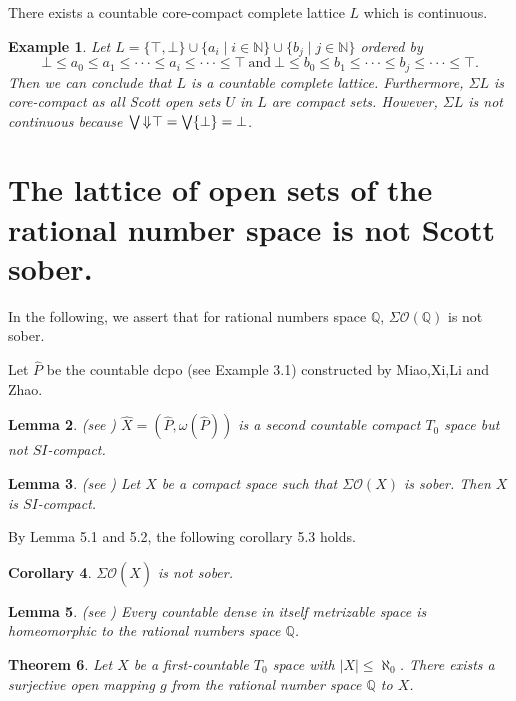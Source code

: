 \documentclass[preprint,12pt]{elsarticle}
\numberwithin{equation}{section}
\newtheorem{theorem}{Theorem}[section]
\newtheorem{lemma}[theorem]{Lemma}
\newtheorem{corollary}[theorem]{Corollary}
\newtheorem{example}[theorem]{Example}
\newcommand{\uuar}{\mathord{\Downarrow}\hspace{0.05em}}
\begin{document}
There exists a countable core-compact complete lattice $L$ which is continuous.
\begin{example} {\rm Let $L=\{\top,\bot\}\cup\{a_{i}\mid i\in\mathbb{N}\}\cup\{b_{j}\mid j\in\mathbb{N}\}$ ordered by $$\bot\leq a_{0}\leq a_{1}\leq\cdot\cdot\cdot\leq a_{i}\leq\cdot\cdot\cdot\leq\top\ \text{and}\ \bot\leq b_{0}\leq b_{1}\leq\cdot\cdot\cdot\leq b_{j}\leq\cdot\cdot\cdot\leq\top.$$ Then we can conclude that $L$ is a countable complete lattice. Furthermore, $\Sigma L$ is core-compact as all Scott open sets $U$ in $L$ are compact sets. However, $\Sigma L$ is not continuous because $\bigvee\uuar \top=\bigvee\{\bot\}=\bot$. }

\end{example}


\section{The lattice of open sets of the rational number space is not Scott sober.}
In the following, we assert that for rational numbers space $\mathbb{Q}$, $\Sigma\mathcal{O}(\mathbb{Q})$ is not sober.

Let $\widehat{P}$ be the countable dcpo (see \cite{AB75} Example 3.1) constructed by Miao,Xi,Li and Zhao.
\begin{lemma}{\rm (see \cite{U18}) $\widehat{X}=(\widehat{P},\omega(\widehat{P}))$ is a second countable compact $T_{0}$ space but not $SI$-compact.}
\end{lemma}



\begin{lemma}{\rm (see \cite{U19}) Let $X$ be a compact space such that $\Sigma\mathcal{O}(X)$ is sober. Then $X$ is $SI$-compact.}
\end{lemma}

By Lemma 5.1 and 5.2, the following corollary 5.3 holds.

\begin{corollary}{\rm $\Sigma\mathcal{O}(\widehat{X})$ is not sober.}

\end{corollary}

\begin{lemma}{\rm (see \cite{RE77}) Every countable dense in itself metrizable space is homeomorphic to the rational numbers space $\mathbb{Q}$.}
\end{lemma}

\begin{theorem} {\rm Let $X$ be a first-countable $T_{0}$ space with $|X|\leq\aleph_{0}$. There exists a surjective open mapping $g$ from the rational number space $\mathbb{Q}$ to $X$.}
\end{theorem}
\end{document}
